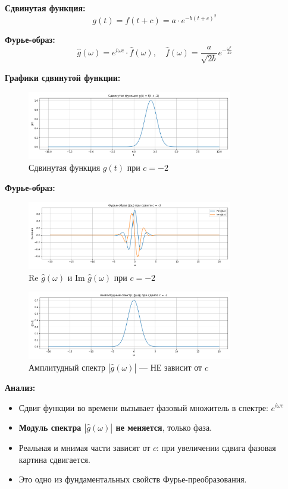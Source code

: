 \textbf{Сдвинутая функция:}
\[
g(t) = f(t + c) = a \cdot e^{-b (t + c)^2}
\]

\textbf{Фурье-образ:}
\[
\hat{g}(\omega) = e^{i \omega c} \cdot \hat{f}(\omega), \quad \hat{f}(\omega) = \frac{a}{\sqrt{2b}} e^{-\frac{\omega^2}{4b}}
\]

\textbf{Графики сдвинутой функции:}

\begin{figure}[H]
    \centering
    \includegraphics[width=0.8\textwidth]{g_function_c-2.png}
    \caption{Сдвинутая функция $g(t)$ при $c = -2$}
\end{figure}

\textbf{Фурье-образ:}

\begin{figure}[H]
    \centering
    \includegraphics[width=0.8\textwidth]{g_hat_complex_c-2.png}
    \caption{Re $\hat{g}(\omega)$ и Im $\hat{g}(\omega)$ при $c = -2$}
\end{figure}

\begin{figure}[H]
    \centering
    \includegraphics[width=0.8\textwidth]{g_hat_magnitude_c-2.png}
    \caption{Амплитудный спектр $|\hat{g}(\omega)|$ — НЕ зависит от $c$}
\end{figure}

\textbf{Анализ:}

\begin{itemize}
    \item Сдвиг функции во времени вызывает фазовый множитель в спектре: $e^{i \omega c}$
    \item \textbf{Модуль спектра $|\hat{g}(\omega)|$ не меняется}, только фаза.
    \item Реальная и мнимая части зависят от $c$: при увеличении сдвига фазовая картина сдвигается.
    \item Это одно из фундаментальных свойств Фурье-преобразования.
\end{itemize}

